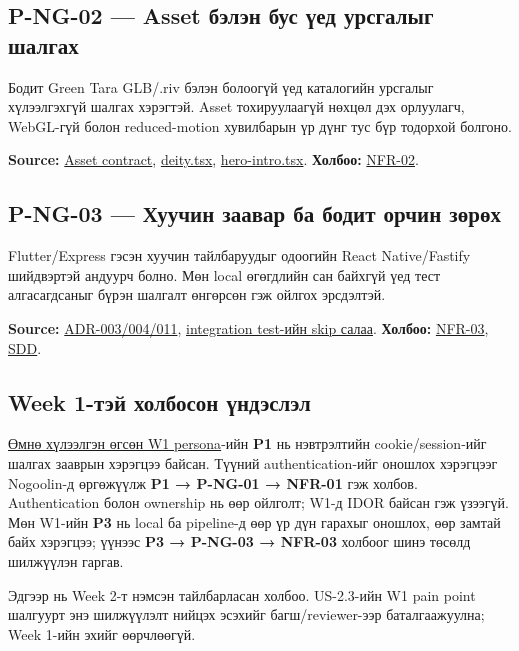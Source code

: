 \subsection{P-NG-02 --- Asset бэлэн бус үед урсгалыг
шалгах}\label{doc2-p-ng-02-asset-ux431ux44dux43bux44dux43d-ux431ux443ux441-ux4afux435ux434-ux443ux440ux441ux433ux430ux43bux44bux433-ux448ux430ux43bux433ux430ux445}

Бодит Green Tara GLB/.riv бэлэн болоогүй үед каталогийн урсгалыг
хүлээлгэхгүй шалгах хэрэгтэй. Asset тохируулаагүй нөхцөл дэх орлуулагч,
WebGL-гүй болон reduced-motion хувилбарын үр дүнг тус бүр тодорхой
болгоно.

\textbf{Source:} \href{../../../agent-context/ASSET_SPECS.md}{Asset
contract},
\href{../../../apps/web/src/components/intro/deity.tsx}{deity.tsx},
\href{../../../apps/web/src/components/intro/hero-intro.tsx}{hero-intro.tsx}.
\textbf{Холбоо:}
\href{../../requirements/requirements.md\#nfr-02}{NFR-02}.

\subsection{P-NG-03 --- Хуучин заавар ба бодит орчин
зөрөх}\label{doc2-p-ng-03-ux445ux443ux443ux447ux438ux43d-ux437ux430ux430ux432ux430ux440-ux431ux430-ux431ux43eux434ux438ux442-ux43eux440ux447ux438ux43d-ux437ux4e9ux440ux4e9ux445}

Flutter/Express гэсэн хуучин тайлбаруудыг одоогийн React Native/Fastify
шийдвэртэй андуурч болно. Мөн local өгөгдлийн сан байхгүй үед тест
алгасагдсаныг бүрэн шалгалт өнгөрсөн гэж ойлгох эрсдэлтэй.

\textbf{Source:}
\href{../../../agent-context/DECISIONS.md}{ADR-003/004/011},
\href{../../../backend/api/tests/inquiry-cart.integration.test.ts}{integration
test-ийн skip салаа}. \textbf{Холбоо:}
\href{../../requirements/requirements.md\#nfr-03}{NFR-03},
\href{../../architecture/sdd-template.md}{SDD}.

\subsection{Week 1-тэй холбосон
үндэслэл}\label{doc2-week-1-ux442ux44dux439-ux445ux43eux43bux431ux43eux441ux43eux43d-ux4afux43dux434ux44dux441ux43bux44dux43b}

\href{../sem1/wiki/02_audience_persona.md}{Өмнө хүлээлгэн өгсөн W1
persona}-ийн \textbf{P1} нь нэвтрэлтийн cookie/session-ийг шалгах
зааврын хэрэгцээ байсан. Түүний authentication-ийг оношлох хэрэгцээг
Nogoolin-д өргөжүүлж \textbf{P1 → P-NG-01 → NFR-01} гэж холбов.
Authentication болон ownership нь өөр ойлголт; W1-д IDOR байсан гэж
үзээгүй. Мөн W1-ийн \textbf{P3} нь local ба pipeline-д өөр үр дүн
гарахыг оношлох, өөр замтай байх хэрэгцээ; үүнээс \textbf{P3 → P-NG-03 →
NFR-03} холбоог шинэ төсөлд шилжүүлэн гаргав.

Эдгээр нь Week 2-т нэмсэн тайлбарласан холбоо. US-2.3-ийн W1 pain point
шалгуурт энэ шилжүүлэлт нийцэх эсэхийг багш/reviewer-ээр баталгаажуулна;
Week 1-ийн эхийг өөрчлөөгүй.
